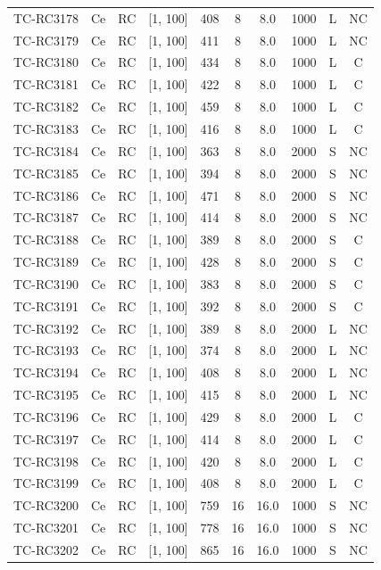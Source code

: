 \begin{longtable}{lccccccccc}
TC-RC3178 & Ce & RC & [1, 100] & 408 & 8 & 8.0 & 1000 & L & NC \\
TC-RC3179 & Ce & RC & [1, 100] & 411 & 8 & 8.0 & 1000 & L & NC \\
TC-RC3180 & Ce & RC & [1, 100] & 434 & 8 & 8.0 & 1000 & L & C \\
TC-RC3181 & Ce & RC & [1, 100] & 422 & 8 & 8.0 & 1000 & L & C \\
TC-RC3182 & Ce & RC & [1, 100] & 459 & 8 & 8.0 & 1000 & L & C \\
TC-RC3183 & Ce & RC & [1, 100] & 416 & 8 & 8.0 & 1000 & L & C \\
TC-RC3184 & Ce & RC & [1, 100] & 363 & 8 & 8.0 & 2000 & S & NC \\
TC-RC3185 & Ce & RC & [1, 100] & 394 & 8 & 8.0 & 2000 & S & NC \\
TC-RC3186 & Ce & RC & [1, 100] & 471 & 8 & 8.0 & 2000 & S & NC \\
TC-RC3187 & Ce & RC & [1, 100] & 414 & 8 & 8.0 & 2000 & S & NC \\
TC-RC3188 & Ce & RC & [1, 100] & 389 & 8 & 8.0 & 2000 & S & C \\
TC-RC3189 & Ce & RC & [1, 100] & 428 & 8 & 8.0 & 2000 & S & C \\
TC-RC3190 & Ce & RC & [1, 100] & 383 & 8 & 8.0 & 2000 & S & C \\
TC-RC3191 & Ce & RC & [1, 100] & 392 & 8 & 8.0 & 2000 & S & C \\
TC-RC3192 & Ce & RC & [1, 100] & 389 & 8 & 8.0 & 2000 & L & NC \\
TC-RC3193 & Ce & RC & [1, 100] & 374 & 8 & 8.0 & 2000 & L & NC \\
TC-RC3194 & Ce & RC & [1, 100] & 408 & 8 & 8.0 & 2000 & L & NC \\
TC-RC3195 & Ce & RC & [1, 100] & 415 & 8 & 8.0 & 2000 & L & NC \\
TC-RC3196 & Ce & RC & [1, 100] & 429 & 8 & 8.0 & 2000 & L & C \\
TC-RC3197 & Ce & RC & [1, 100] & 414 & 8 & 8.0 & 2000 & L & C \\
TC-RC3198 & Ce & RC & [1, 100] & 420 & 8 & 8.0 & 2000 & L & C \\
TC-RC3199 & Ce & RC & [1, 100] & 408 & 8 & 8.0 & 2000 & L & C \\
TC-RC3200 & Ce & RC & [1, 100] & 759 & 16 & 16.0 & 1000 & S & NC \\
TC-RC3201 & Ce & RC & [1, 100] & 778 & 16 & 16.0 & 1000 & S & NC \\
TC-RC3202 & Ce & RC & [1, 100] & 865 & 16 & 16.0 & 1000 & S & NC \\

\end{longtable}
